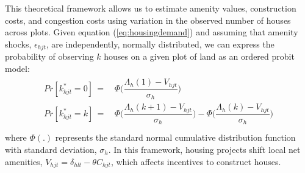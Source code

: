 \documentclass[12pt]{article}
\begin{document}
This theoretical framework allows us to estimate amenity values, construction costs, and congestion costs using variation in the observed number of houses across plots.  Given equation (\ref{eq:housingdemand}) and assuming that amenity shocks, $\epsilon_{hjt}$, are independently, normally distributed, we can express the probability of observing $k$ houses on a given plot of land as an ordered probit model:
\begin{align}
\label{eq:housingdemandprob}
\begin{split}
Pr[ k_{hjt}^{*} =0] \, = \, & \Phi \Bigg(\dfrac{\Lambda_{h}(1) - V_{hjt} }{\sigma_{h}} \Bigg)  \\
Pr[ k_{hjt}^{*} =k] \, = \, &  \Phi \Bigg(\dfrac{\Lambda_{h}(k+1) - V_{hjt} }{\sigma_{h}} \Bigg) - \Phi \Bigg(\dfrac{\Lambda_{h}(k) - V_{hjt} }{\sigma_{h}} \Bigg) \\
\end{split}
\end{align}
\noindent where $\Phi (.)$ represents the standard normal cumulative distribution function with standard deviation, $\sigma_{h}$.  In this framework, housing projects shift local net amenities, $V_{hjt} = \delta_{hlt}  - \theta C_{hjt}$, which affects incentives to construct houses. 
\end{document}
